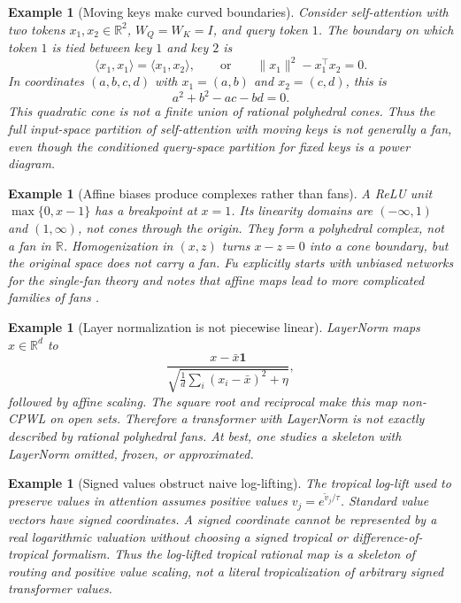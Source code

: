 \documentclass[11pt]{article}
\newtheorem{example}[theorem]{Example}
\newcommand{\R}{\mathbb{R}}
\newcommand{\one}{\mathbf{1}}
\begin{document}
\begin{example}[Moving keys make curved boundaries]
\label{ex:movingkeys}
Consider self-attention with two tokens $x_1,x_2\in\R^2$, $W_Q=W_K=I$, and query token $1$.  The boundary on which token $1$ is tied between key $1$ and key $2$ is
\[
  \langle x_1,x_1\rangle=\langle x_1,x_2\rangle,
  \qquad\text{or}\qquad
  \|x_1\|^2-x_1^\top x_2=0.
\]
In coordinates $(a,b,c,d)$ with $x_1=(a,b)$ and $x_2=(c,d)$, this is
\[
  a^2+b^2-ac-bd=0.
\]
This quadratic cone is not a finite union of rational polyhedral cones.  Thus the full input-space partition of self-attention with moving keys is not generally a fan, even though the conditioned query-space partition for fixed keys is a power diagram.
\end{example}

\begin{example}[Affine biases produce complexes rather than fans]
A ReLU unit $\max\{0,x-1\}$ has a breakpoint at $x=1$.  Its linearity domains are $(-\infty,1)$ and $(1,\infty)$, not cones through the origin.  They form a polyhedral complex, not a fan in $\R$.  Homogenization in $(x,z)$ turns $x-z=0$ into a cone boundary, but the original space does not carry a fan.  Fu explicitly starts with unbiased networks for the single-fan theory and notes that affine maps lead to more complicated families of fans \cite{fu2025toricrelu}.
\end{example}

\begin{example}[Layer normalization is not piecewise linear]
LayerNorm maps $x\in\R^d$ to
\[
  \frac{x-\bar x\one}{\sqrt{\frac1d\sum_i(x_i-\bar x)^2+\eta}},
\]
followed by affine scaling.  The square root and reciprocal make this map non-CPWL on open sets.  Therefore a transformer with LayerNorm is not exactly described by rational polyhedral fans.  At best, one studies a skeleton with LayerNorm omitted, frozen, or approximated.
\end{example}

\begin{example}[Signed values obstruct naive log-lifting]
The tropical log-lift used to preserve values in attention assumes positive values $v_j=e^{\tilde v_j/\tau}$.  Standard value vectors have signed coordinates.  A signed coordinate cannot be represented by a real logarithmic valuation without choosing a signed tropical or difference-of-tropical formalism.  Thus the log-lifted tropical rational map is a skeleton of routing and positive value scaling, not a literal tropicalization of arbitrary signed transformer values.
\end{example}
\end{document}
